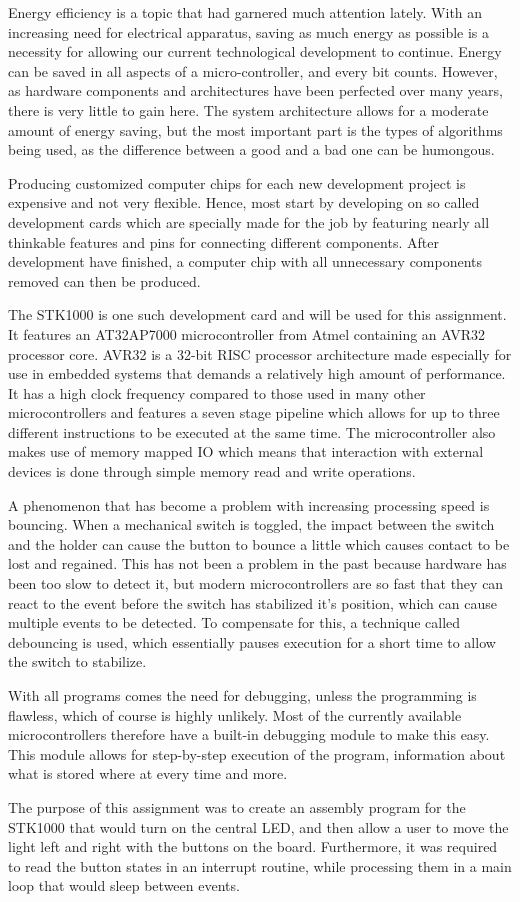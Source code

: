 Energy efficiency is a topic that had garnered much attention lately. With an increasing need for electrical apparatus, saving as much energy as possible is a necessity for allowing our current technological development to continue. Energy can be saved in all aspects of a micro-controller, and every bit counts. However, as hardware components and architectures have been perfected over many years, there is very little to gain here. The system architecture allows for a moderate amount of energy saving, but the most important part is the types of algorithms being used, as the difference between a good and a bad one can be humongous.

Producing customized computer chips for each new development project is expensive and not very flexible. Hence, most start by developing on so called development cards which are specially made for the job by featuring nearly all thinkable features and pins for connecting different components. After development have finished, a computer chip with all unnecessary components removed can then be produced.

The STK1000 is one such development card and will be used for this assignment. It features an AT32AP7000 microcontroller from Atmel containing an AVR32 processor core. AVR32 is a 32-bit RISC processor architecture made especially for use in embedded systems that demands a relatively high amount of performance. It has a high clock frequency compared to those used in many other microcontrollers and features a seven stage pipeline which allows for up to three different instructions to be executed at the same time. The microcontroller also makes use of memory mapped IO which means that interaction with external devices is done through simple memory read and write operations.

A phenomenon that has become a problem with increasing processing speed is bouncing. When a mechanical switch is toggled, the impact between the switch and the holder can cause the button to bounce a little which causes contact to be lost and regained. This has not been a problem in the past because hardware has been too slow to detect it, but modern microcontrollers are so fast that they can react to the event before the switch has stabilized it’s position, which can cause multiple events to be detected. To compensate for this, a technique called debouncing is used, which essentially pauses execution for a short time to allow the switch to stabilize.

With all programs comes the need for debugging, unless the programming is flawless, which of course is highly unlikely. Most of the currently available microcontrollers therefore have a built-in debugging module to make this easy. This module allows for step-by-step execution of the program, information about what is stored where at every time and more.

The purpose of this assignment was to create an assembly program for the STK1000 that would turn on the central LED, and then allow a user to move the light left and right with the buttons on the board. Furthermore, it was required to read the button states in an interrupt routine, while processing them in a main loop that would sleep between events.
